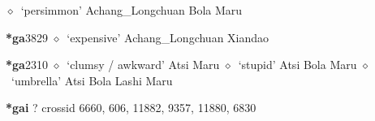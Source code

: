 \begin{list}{}{\leftmargin=1.5em \itemindent=-1.5em}
\hspace{1ex}
         $\diamond$~`persimmon'
         Achang\_Longchuan 
\hspace{1ex}
         Bola 
\hspace{1ex}
         Maru 
  \item {\footnotesize \textbf{*ga}}{\tiny 3829}
\hspace{1ex}
         $\diamond$~`expensive'
         Achang\_Longchuan 
\hspace{1ex}
         Xiandao 
  \item {\footnotesize \textbf{*ga}}{\tiny 2310}
\hspace{1ex}
         $\diamond$~`clumsy / awkward'
         Atsi 
\hspace{1ex}
         Maru 
\hspace{1ex}
         $\diamond$~`stupid'
         Atsi 
\hspace{1ex}
         Bola 
\hspace{1ex}
         Maru 
\hspace{1ex}
         $\diamond$~`umbrella'
         Atsi 
\hspace{1ex}
         Bola 
\hspace{1ex}
         Lashi 
\hspace{1ex}
         Maru 
  \end{list}
\item
\textbf{*gai}
?
  {\tiny crossid 6660, 606, 11882, 9357, 11880, 6830}
